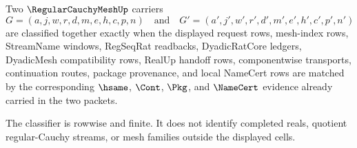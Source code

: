 \begin{definition}
\label{def:regular-cauchy-mesh-classifier}
Two $\RegularCauchyMeshUp$ carriers
$$
G=(a,j,w,r,d,m,e,h,c,p,n)
\quad\text{and}\quad
G'=(a',j',w',r',d',m',e',h',c',p',n')
$$
are classified together exactly when the displayed request rows, mesh-index rows, StreamName windows, RegSeqRat readbacks, DyadicRatCore ledgers, DyadicMesh compatibility rows, RealUp handoff rows, componentwise transports, continuation routes, package provenance, and local NameCert rows are matched by the corresponding $\hsame$, $\Cont$, $\Pkg$, and $\NameCert$ evidence already carried in the two packets.

The classifier is rowwise and finite. It does not identify completed reals, quotient regular-Cauchy streams, or mesh families outside the displayed cells.
\end{definition}


